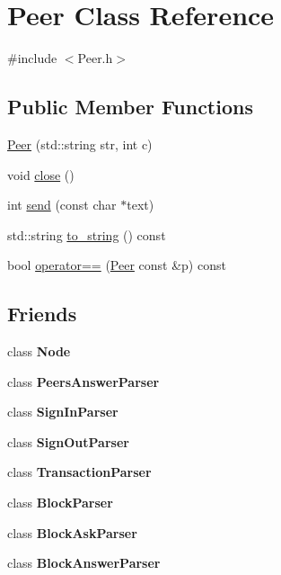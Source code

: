 \hypertarget{classPeer}{}\section{Peer Class Reference}
\label{classPeer}


{\ttfamily \#include $<$Peer.\+h$>$}

\subsection*{Public Member Functions}
\begin{DoxyCompactItemize}
\item 
\mbox{\hyperlink{classPeer_a818beac4dac9c4a1d9ebffcfaed2e98f}{Peer}} (std\+::string str, int c)
\item 
void \mbox{\hyperlink{classPeer_a314984f7fd35ec189f125bea9483881b}{close}} ()
\item 
int \mbox{\hyperlink{classPeer_a0f591fdb4807871049e9471f7464fc6a}{send}} (const char $\ast$text)
\item 
std\+::string \mbox{\hyperlink{classPeer_a44641ad4373c7e8f8237e0d976dc8321}{to\+\_\+string}} () const
\item 
bool \mbox{\hyperlink{classPeer_a9a06bb1ad4da0564617bba731099a6eb}{operator==}} (\mbox{\hyperlink{classPeer}{Peer}} const \&p) const
\end{DoxyCompactItemize}
\subsection*{Friends}
\begin{DoxyCompactItemize}
\item 
\mbox{\label{classPeer_a6db9d28bd448a131448276ee03de1e6d}} 
class {\bfseries Node}
\item 
\mbox{\label{classPeer_a9e3cdec4aeecdf3e8af4ce55247056b5}} 
class {\bfseries Peers\+Answer\+Parser}
\item 
\mbox{\label{classPeer_aedbc6d52e9be9e8e9b9e185d53352518}} 
class {\bfseries Sign\+In\+Parser}
\item 
\mbox{\label{classPeer_ad8b6311fd20b52f64b7ab8838b5c74d1}} 
class {\bfseries Sign\+Out\+Parser}
\item 
\mbox{\label{classPeer_a760b1478b5214c122458f0f19d45c127}} 
class {\bfseries Transaction\+Parser}
\item 
\mbox{\label{classPeer_a8428b3aeea6607d1ba12e603ff9d015c}} 
class {\bfseries Block\+Parser}
\item 
\mbox{\label{classPeer_a8400d228b4c8e958886ed78dbbce07cf}} 
class {\bfseries Block\+Ask\+Parser}
\item 
\mbox{\label{classPeer_aec03b63df2dcea2b43f28ba4ede77b27}} 
class {\bfseries Block\+Answer\+Parser}
\end{DoxyCompactItemize}



